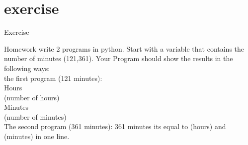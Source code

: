 \documentclass[aspectratio=169,19pt,english]{beamer}
\begin{document}
{\section{exercise}
\begin{frame}{Exercise}
	\begin{alertblock}{Homework}
		write 2 programs in python. Start with a variable that contains the number of minutes (121,361). 
		Your Program should show the results in the following ways:\\
		the first program (121 minutes): \\
		Hours \\
		(number of hours)\\
		Minutes\\
		(number of minutes)
		\\
		The second program (361 minutes):
		361 minutes its equal to (hours) and (minutes) in one line.
	\end{alertblock}
\end{frame}
}
\end{document}
